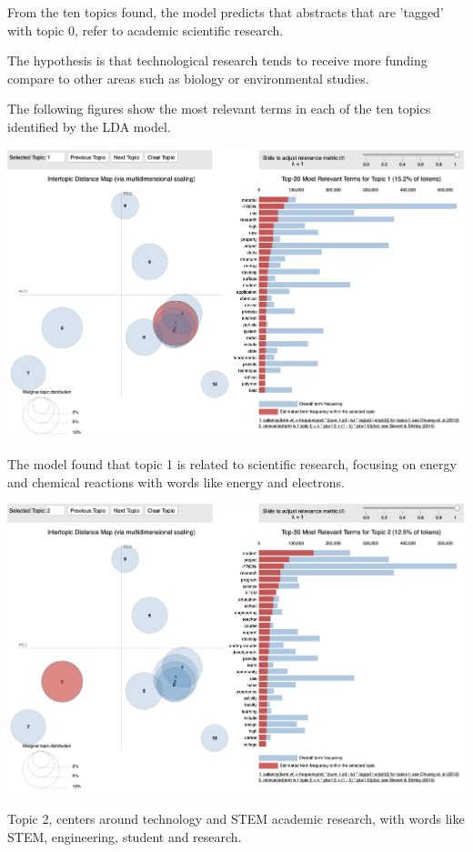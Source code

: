 \documentclass[11pt, oneside]{article}   	%
\begin{document}
From the ten topics found, the model predicts that abstracts that are 'tagged' with topic 0, refer to academic scientific research.
 
 The hypothesis is that technological research tends to receive more funding compare to other areas such as biology or environmental studies.
 
 The following figures show the most relevant terms in each of the ten topics identified by the LDA model.
 
 \includegraphics[width=\textwidth]{ldaVisualizationTopic1}
 
The model found that topic 1 is related to scientific research, focusing on energy and chemical reactions with words like energy and electrons.
 
 \includegraphics[width=\textwidth]{ldaVisualizationTopic2}
  
 Topic 2, centers around technology and STEM academic research, with words like  STEM, engineering, student and research.
 
\end{document}
